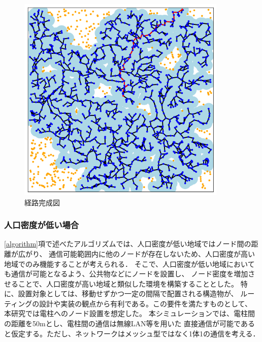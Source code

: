 \documentclass[a4paper, 11pt]{ltjsarticle}
\begin{document}
\begin{enumerate}[label=\textbf{(\arabic*)}]
        \begin{figure}[h]
          \centering
          \includegraphics[width=100mm]{4_step.png}
          \caption{経路完成図}
          \label{figure:fourth_step}
        \end{figure}

\end{enumerate}

\subsubsection{人口密度が低い場合}
\ref{algorithm}項で述べたアルゴリズムでは、人口密度が低い地域ではノード間の距離が広がり、
通信可能範囲内に他のノードが存在しないため、人口密度が高い地域でのみ機能することが考えられる．
そこで、人口密度が低い地域においても通信が可能となるよう、公共物などにノードを設置し、
ノード密度を増加させることで、人口密度が高い地域と類似した環境を構築することとした。
特に、設置対象としては、移動せずかつ一定の間隔で配置される構造物が、
ルーティングの設計や実装の観点から有利である。この要件を満たすものとして、
本研究では電柱へのノード設置を想定した。
本シミュレーションでは、電柱間の距離を50mとし\cite{電柱設置間隔}、電柱間の通信は無線LAN等を用いた
直接通信が可能であると仮定する。ただし、ネットワークはメッシュ型ではなく1体1の通信を考える．
\end{document}
